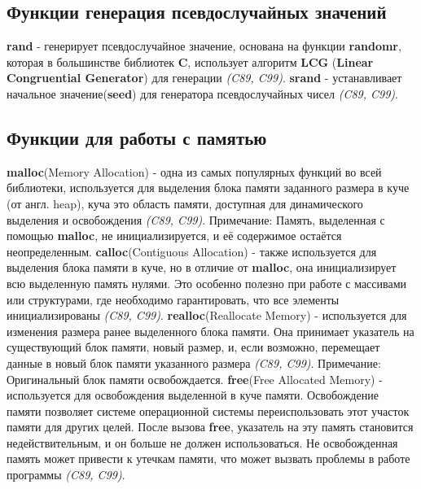 \documentclass[12pt, letterpaper]{article}
\begin{document}
\subsection{Функции генерация псевдослучайных значений}
\textbf{rand} - генерирует псевдослучайное значение, основана на функции \textbf{randomr}, которая в большинстве библиотек \textbf{C},
использует алгоритм \textbf{LCG} (\textbf{Linear Congruential Generator}) для генерации \textit{(C89, C99)}.
\newline
\newline
\textbf{srand} - устанавливает начальное значение(\textbf{seed}) для генератора псевдослучайных чисел \textit{(C89, C99)}.

\subsection{Функции для работы с памятью}
\textbf{malloc}(Memory Allocation) - одна из самых популярных функций во всей библиотеки, используется для выделения блока памяти
заданного размера в куче (от англ. heap), куча это область памяти, доступная для динамического выделения и освобождения \textit{(C89, C99)}.
\newline
\newline
Примечание: Память, выделенная с помощью \textbf{malloc}, не инициализируется, и её содержимое остаётся неопределенным.
\newline
\newline
\textbf{calloc}(Contiguous Allocation) - также используется для выделения блока памяти в куче,
но в отличие от \textbf{malloc}, она инициализирует всю выделенную память нулями. Это особенно полезно при работе
с массивами или структурами, где необходимо гарантировать, что все элементы инициализированы \textit{(C89, C99)}.
\newline
\newline
\textbf{realloc}(Reallocate Memory) - используется для изменения размера ранее выделенного блока памяти.
Она принимает указатель на существующий блок памяти, новый размер, и, если возможно, перемещает данные в новый блок памяти указанного размера \textit{(C89, C99)}.
\newline
\newline
Примечание: Оригинальный блок памяти освобождается.
\newline
\newline
\textbf{free}(Free Allocated Memory) - используется для освобождения выделенной в куче памяти.
Освобождение памяти позволяет системе операционной системы переиспользовать этот участок памяти
для других целей. После вызова \textbf{free}, указатель на эту память становится недействительным, и он больше
не должен использоваться. Не освобожденная память может привести к утечкам памяти, что может вызвать проблемы в работе программы
\textit{(C89, C99)}.
\end{document}
